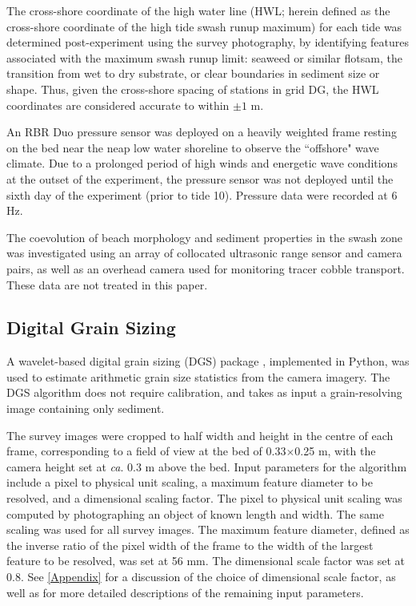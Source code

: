 \documentclass[preprint,12pt,authoryear]{elsarticle}
\begin{document}
The cross-shore coordinate of the high water line (HWL; herein defined as the cross-shore coordinate of the high tide swash runup maximum) for each tide was determined post-experiment using the survey photography, by identifying features associated with the maximum swash runup limit: seaweed or similar flotsam, the transition from wet to dry substrate, or clear boundaries in sediment size or shape. Thus, given the cross-shore spacing of stations in grid DG, the HWL coordinates are considered accurate to within $\pm1$ m. 

An RBR Duo pressure sensor was deployed on a heavily weighted frame resting on the bed near the neap low water shoreline to observe the ``offshore" wave climate. Due to a prolonged period of high winds and energetic wave conditions at the outset of the experiment, the pressure sensor was not deployed until the sixth day of the experiment (prior to tide 10). Pressure data were recorded at 6 Hz.

The coevolution of beach morphology and sediment properties in the swash zone was investigated using an array of collocated ultrasonic range sensor and camera pairs, as well as an overhead camera used for monitoring tracer cobble transport. These data are not treated in this paper.

\subsection{Digital Grain Sizing}\label{Methods:DGS}

A wavelet-based digital grain sizing (DGS) package \citep[see][]{Buscombe2013}, implemented in Python, was used to estimate arithmetic grain size statistics from the camera imagery. The DGS algorithm does not require calibration, and takes as input a grain-resolving image containing only sediment. 

The survey images were cropped to half width and height in the centre of each frame, corresponding to a field of view at the bed of 0.33$\times$0.25 m, with the camera height set at \textit{ca}. 0.3 m above the bed. Input parameters for the algorithm include a pixel to physical unit scaling, a maximum feature diameter to be resolved, and a dimensional scaling factor. The pixel to physical unit scaling was computed by photographing an object of known length and width. The same scaling was used for all survey images. The maximum feature diameter, defined as the inverse ratio of the pixel width of the frame to the width of the largest feature to be resolved, was set at 56 mm. The dimensional scale factor was set at 0.8. See \ref{Appendix} for a discussion of the choice of dimensional scale factor, as well as for more detailed descriptions of the remaining input parameters. 
\end{document}
